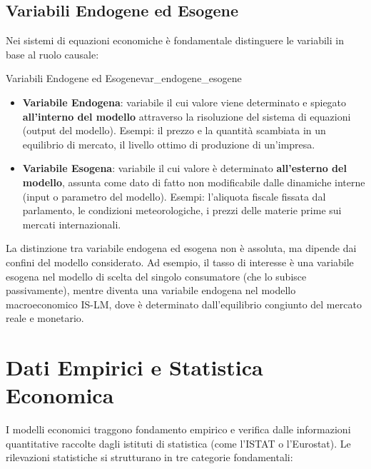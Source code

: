 \subsection{Variabili Endogene ed Esogene}
Nei sistemi di equazioni economiche è fondamentale distinguere le variabili in base al ruolo causale:

\begin{definizione}{Variabili Endogene ed Esogene}{var_endogene_esogene}
\begin{itemize}
    \item \textbf{Variabile Endogena}: variabile il cui valore viene determinato e spiegato \textbf{all'interno del modello} attraverso la risoluzione del sistema di equazioni (output del modello). Esempi: il prezzo e la quantità scambiata in un equilibrio di mercato, il livello ottimo di produzione di un'impresa.
    \item \textbf{Variabile Esogena}: variabile il cui valore è determinato \textbf{all'esterno del modello}, assunta come dato di fatto non modificabile dalle dinamiche interne (input o parametro del modello). Esempi: l'aliquota fiscale fissata dal parlamento, le condizioni meteorologiche, i prezzi delle materie prime sui mercati internazionali.
\end{itemize}
\end{definizione}

\begin{osservazione}
La distinzione tra variabile endogena ed esogena non è assoluta, ma dipende dai confini del modello considerato. Ad esempio, il tasso di interesse è una variabile esogena nel modello di scelta del singolo consumatore (che lo subisce passivamente), mentre diventa una variabile endogena nel modello macroeconomico IS-LM, dove è determinato dall'equilibrio congiunto del mercato reale e monetario.
\end{osservazione}

\section{Dati Empirici e Statistica Economica}

I modelli economici traggono fondamento empirico e verifica dalle informazioni quantitative raccolte dagli istituti di statistica (come l'ISTAT o l'Eurostat). Le rilevazioni statistiche si strutturano in tre categorie fondamentali:

